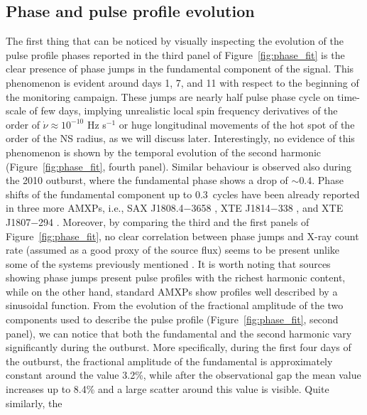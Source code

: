 \documentclass[fleqn,usenatbib]{mnras}
\newcommand{\swiftj}{SWIFT J1749.4$-$2807}
\begin{document}

\subsection{Phase and pulse profile evolution}
The first thing that can be noticed by visually inspecting the evolution of the pulse profile phases reported in the third panel of Figure~\ref{fig:phase_fit} is the clear presence of phase jumps in the fundamental component of the signal. This phenomenon is evident around days 1, 7, and 11 with respect to the beginning of the monitoring campaign. These jumps are nearly half pulse phase cycle on time-scale of few days, implying unrealistic local spin frequency derivatives of the order of $\dot{\nu} \approx 10^{-10}$ Hz s$^{-1}$ or huge longitudinal movements of the hot spot of the order of the NS radius, as we will discuss later. Interestingly, no evidence of this phenomenon is shown by the temporal evolution of the second harmonic (Figure~\ref{fig:phase_fit}, fourth panel). Similar behaviour is observed also during the 2010 outburst, where the fundamental phase shows a drop of $\sim0.4$. Phase shifts of the fundamental component up to 0.3~cycles have been already reported in three more AMXPs, i.e., SAX J1808.4$-$3658 \citep{Burderi:2006va}, XTE J1814$-$338 \citep{Papitto:2007wp}, and XTE J1807$-$294 \citep{Riggio:2008wz,Patruno:2010wi}. Moreover, by comparing the third and the first panels of Figure~\ref{fig:phase_fit}, no clear correlation between phase jumps and X-ray count rate (assumed as a good proxy of the source flux) seems to be present unlike some of the systems previously mentioned \citep[see e.g.,][]{Papitto:2007wp,Patruno:2010wi}. It is worth noting that sources showing phase jumps present pulse profiles with the richest harmonic content, while on the other hand, standard AMXPs show profiles well described by a sinusoidal function. From the evolution of the fractional amplitude of the two components used to describe the pulse profile (Figure~\ref{fig:phase_fit}, second panel), we can notice that both the fundamental and the second harmonic vary significantly during the outburst. More specifically, during the first four days of the outburst, the fractional amplitude of the fundamental is approximately constant around the value 3.2\%, while after the observational gap the mean value increases up to 8.4\% and a large scatter around this value is visible. Quite similarly, the 
\end{document}
